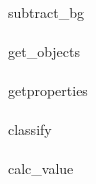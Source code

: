 \documentclass[11pt]{article}
\begin{document}
\paragraph{}
subtract\_bg

\paragraph{}
get\_objects

\paragraph{}
getproperties

\paragraph{}
classify

\paragraph{}
calc\_value

\end{document}
